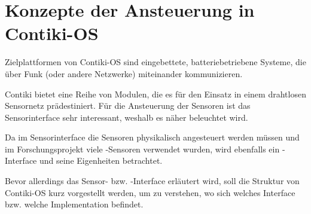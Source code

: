 \section{Konzepte der Ansteuerung in Contiki-OS}

	Zielplattformen von Contiki-OS sind eingebettete,
	batteriebetriebene Systeme, die über Funk (oder andere Netzwerke)
	miteinander kommunizieren. \autocite{contiki, dunkels04contiki}

	Contiki bietet eine Reihe von Modulen, die es für den Einsatz
	in einem drahtlosen Sensornetz prädestiniert.
	Für die Ansteuerung der Sensoren ist das Sensorinterface sehr
	interessant, weshalb es näher beleuchtet wird.

	Da im Sensorinterface die Sensoren physikalisch angesteuert werden
	müssen und im Forschungsprojekt viele \ItC-Sensoren verwendet wurden,
	wird ebenfalls ein \ItC-Interface und seine Eigenheiten betrachtet.

	Bevor allerdings das Sensor- bzw. \ItC-Interface erläutert wird,
	soll die Struktur von Contiki-OS \autocite{contikidoc} kurz vorgestellt werden,
	um zu verstehen, wo sich welches Interface bzw. welche Implementation
	befindet.

